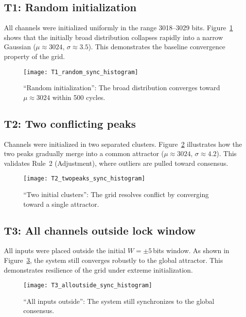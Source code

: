 \documentclass[11pt]{article}
\begin{document}
\subsection*{T1: Random initialization}
All channels were initialized uniformly in the range 3018--3029 bits.  
Figure~\ref{fig:T1_hist} shows that the initially broad distribution collapses rapidly into a narrow Gaussian ($\mu \approx 3024$, $\sigma \approx 3.5$). This demonstrates the baseline convergence property of the grid.

\begin{figure}[htbp!]
  \centering
  \texttt{[image: T1\_random\_sync\_histogram]}
  \caption{\enquote{Random initialization}: The broad distribution converges toward $\mu \approx 3024$ within 500 cycles.}
  \label{fig:T1_hist}
\end{figure}

\subsection*{T2: Two conflicting peaks}
Channels were initialized in two separated clusters.  
Figure~\ref{fig:T2_hist} illustrates how the two peaks gradually merge into a common attractor ($\mu \approx 3024$, $\sigma \approx 4.2$). This validates Rule~2 (Adjustment), where outliers are pulled toward consensus.

\begin{figure}[htbp!]
  \centering
  \texttt{[image: T2\_twopeaks\_sync\_histogram]}
  \caption{\enquote{Two initial clusters}: The grid resolves conflict by converging toward a single attractor.}
  \label{fig:T2_hist}
\end{figure}

\subsection*{T3: All channels outside lock window}
All inputs were placed outside the initial $W=\pm5$\,bits window.  
As shown in Figure~\ref{fig:T3_hist}, the system still converges robustly to the global attractor. This demonstrates resilience of the grid under extreme initialization.

\begin{figure}[htbp!]
  \centering
  \texttt{[image: T3\_alloutside\_sync\_histogram]}
  \caption{\enquote{All inputs outside}: The system still synchronizes to the global consensus.}
  \label{fig:T3_hist}
\end{figure}
\end{document}
